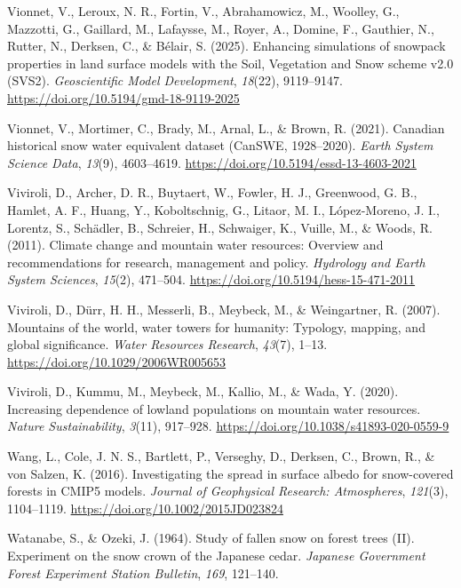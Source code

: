 \documentclass[
  letterpaper,
]{tex/uofsthesis-cs}
\newlength{\cslhangindent}
\newenvironment{CSLReferences}[2] %
 {\begin{list}{}{%
  \setlength{\itemindent}{0pt}
  \setlength{\leftmargin}{0pt}
  \setlength{\parsep}{0pt}
  \ifodd #1
   \setlength{\leftmargin}{\cslhangindent}
   \setlength{\itemindent}{-1\cslhangindent}
  \fi
  \setlength{\itemsep}{#2\baselineskip}}}
 {\end{list}}
\begin{document}
\begin{CSLReferences}{1}{0}
Vionnet, V., Leroux, N. R., Fortin, V., Abrahamowicz, M., Woolley, G.,
Mazzotti, G., Gaillard, M., Lafaysse, M., Royer, A., Domine, F.,
Gauthier, N., Rutter, N., Derksen, C., \& Bélair, S. (2025). Enhancing
simulations of snowpack properties in land surface models with the
{Soil}, {Vegetation} and {Snow} scheme v2.0 ({SVS2}).
\emph{Geoscientific Model Development}, \emph{18}(22), 9119--9147.
\url{https://doi.org/10.5194/gmd-18-9119-2025}

Vionnet, V., Mortimer, C., Brady, M., Arnal, L., \& Brown, R. (2021).
Canadian historical snow water equivalent dataset ({CanSWE},
1928--2020). \emph{Earth System Science Data}, \emph{13}(9), 4603--4619.
\url{https://doi.org/10.5194/essd-13-4603-2021}

Viviroli, D., Archer, D. R., Buytaert, W., Fowler, H. J., Greenwood, G.
B., Hamlet, A. F., Huang, Y., Koboltschnig, G., Litaor, M. I.,
López-Moreno, J. I., Lorentz, S., Schädler, B., Schreier, H., Schwaiger,
K., Vuille, M., \& Woods, R. (2011). Climate change and mountain water
resources: {Overview} and recommendations for research, management and
policy. \emph{Hydrology and Earth System Sciences}, \emph{15}(2),
471--504. \url{https://doi.org/10.5194/hess-15-471-2011}

Viviroli, D., Dürr, H. H., Messerli, B., Meybeck, M., \& Weingartner, R.
(2007). Mountains of the world, water towers for humanity: {Typology},
mapping, and global significance. \emph{Water Resources Research},
\emph{43}(7), 1--13. \url{https://doi.org/10.1029/2006WR005653}

Viviroli, D., Kummu, M., Meybeck, M., Kallio, M., \& Wada, Y. (2020).
Increasing dependence of lowland populations on mountain water
resources. \emph{Nature Sustainability}, \emph{3}(11), 917--928.
\url{https://doi.org/10.1038/s41893-020-0559-9}

Wang, L., Cole, J. N. S., Bartlett, P., Verseghy, D., Derksen, C.,
Brown, R., \& von Salzen, K. (2016). Investigating the spread in surface
albedo for snow-covered forests in {CMIP5} models. \emph{Journal of
Geophysical Research: Atmospheres}, \emph{121}(3), 1104--1119.
\url{https://doi.org/10.1002/2015JD023824}

Watanabe, S., \& Ozeki, J. (1964). Study of fallen snow on forest trees
({II}). {Experiment} on the snow crown of the {Japanese} cedar.
\emph{Japanese Government Forest Experiment Station Bulletin},
\emph{169}, 121--140.


\end{CSLReferences}
\end{document}
